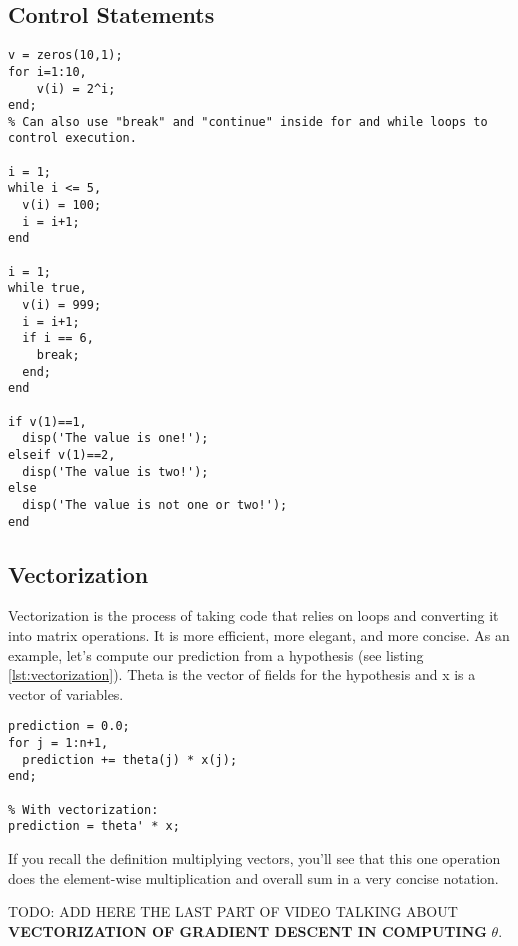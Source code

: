 \subsection{Control Statements}
\begin{lstlisting}[label=lst:ctrlState, caption=Control Statements in Octave]
v = zeros(10,1);
for i=1:10, 
    v(i) = 2^i;
end;
% Can also use "break" and "continue" inside for and while loops to control execution.

i = 1;
while i <= 5,
  v(i) = 100; 
  i = i+1;
end

i = 1;
while true, 
  v(i) = 999; 
  i = i+1;
  if i == 6,
    break;
  end;
end

if v(1)==1,
  disp('The value is one!');
elseif v(1)==2,
  disp('The value is two!');
else
  disp('The value is not one or two!');
end
\end{lstlisting}

\subsection{Vectorization}
Vectorization is the process of taking code that relies on loops and converting it into matrix operations. It is more efficient, more elegant, and more concise.
As an example, let's compute our prediction from a hypothesis (see listing \ref{lst:vectorization}). Theta is the vector of fields for the hypothesis and x is a vector of variables.
\begin{lstlisting}[label=lst:vectorization, caption=Vectorization Example]
% With loops:
prediction = 0.0;
for j = 1:n+1,
  prediction += theta(j) * x(j);
end;

% With vectorization:
prediction = theta' * x;
\end{lstlisting}

If you recall the definition multiplying vectors, you'll see that this one operation does the element-wise multiplication and overall sum in a very concise notation.

TODO: ADD HERE THE LAST PART OF VIDEO TALKING ABOUT \textbf{VECTORIZATION OF GRADIENT DESCENT IN COMPUTING} $\theta$.